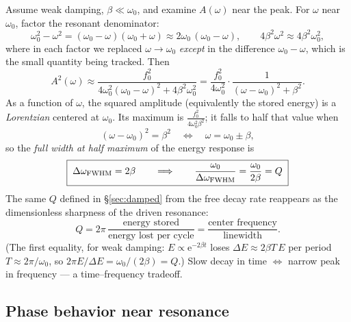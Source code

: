 \documentclass[11pt]{article}
\theoremstyle{plain}
\theoremstyle{definition}
\theoremstyle{remark}
\newcommand{\ee}{\mathrm{e}}
\begin{document}
Assume weak damping, $\beta\ll\omega_0$, and examine $A(\omega)$ near the
peak. For $\omega$ near $\omega_0$, factor the resonant denominator:
\begin{equation}
  \omega_0^2 - \omega^2 = (\omega_0-\omega)(\omega_0+\omega)
  \approx 2\omega_0\,(\omega_0 - \omega),
  \qquad
  4\beta^2\omega^2 \approx 4\beta^2\omega_0^2 ,
\end{equation}
where in each factor we replaced $\omega\to\omega_0$ \emph{except} in the
difference $\omega_0-\omega$, which is the small quantity being tracked. Then
\begin{equation}
  A^2(\omega)
  \approx \frac{f_0^2}{4\omega_0^2(\omega_0-\omega)^2 + 4\beta^2\omega_0^2}
  = \frac{f_0^2}{4\omega_0^2}\cdot
  \frac{1}{(\omega-\omega_0)^2 + \beta^2}.
  \label{eq:lorentzian}
\end{equation}
As a function of $\omega$, the squared amplitude (equivalently the stored
energy) is a \emph{Lorentzian} centered at $\omega_0$. Its maximum is
$\frac{f_0^2}{4\omega_0^2\beta^2}$; it falls to half that value when
\begin{equation}
  (\omega - \omega_0)^2 = \beta^2
  \quad\Longleftrightarrow\quad
  \omega = \omega_0 \pm \beta,
\end{equation}
so the \emph{full width at half maximum} of the energy response is
\begin{equation}
  \boxed{\;
  \Delta\omega_{\rm FWHM} = 2\beta
  \qquad\Longrightarrow\qquad
  \frac{\omega_0}{\Delta\omega_{\rm FWHM}} = \frac{\omega_0}{2\beta} = Q
  \;}
\end{equation}
The same $Q$ defined in \S\ref{sec:damped} from the free decay rate
reappears as the dimensionless sharpness of the driven resonance:
\begin{equation}
  Q = 2\pi\,\frac{\text{energy stored}}{\text{energy lost per cycle}}
  = \frac{\text{center frequency}}{\text{linewidth}} .
\end{equation}
(The first equality, for weak damping: $E \propto \ee^{-2\beta t}$
loses $\Delta E \approx 2\beta T\,E$ per period $T \approx
2\pi/\omega_0$, so $2\pi E/\Delta E = \omega_0/(2\beta) = Q$.)
Slow decay in time $\Leftrightarrow$ narrow peak in frequency --- a
time--frequency tradeoff.

\subsection{Phase behavior near resonance}
\end{document}
